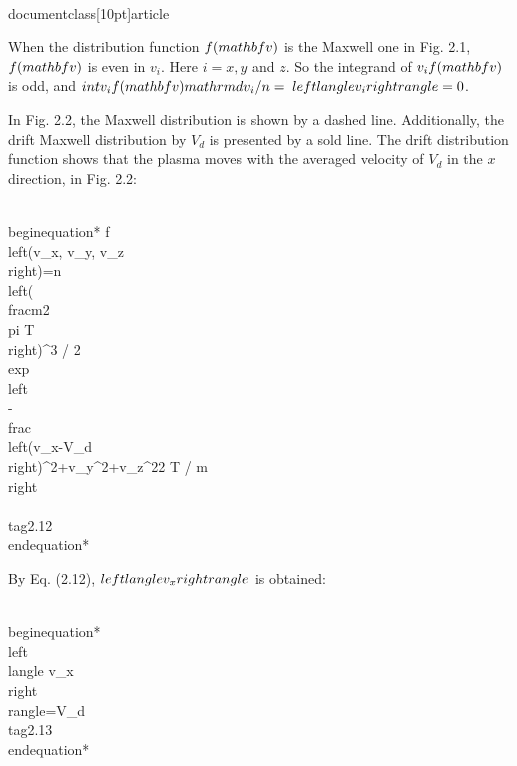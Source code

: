 \\documentclass[10pt]{article}
\begin{document}
When the distribution function $f(\\mathbf{v})$ is the Maxwell one in Fig. 2.1, $f(\\mathbf{v})$ is even in $v_{i}$. Here $i=x, y$ and $z$. So the integrand of $v_{i} f(\\mathbf{v})$ is odd, and $\\int v_{i} f(\\mathbf{v}) \\mathrm{d} v_{i} / n=$ $\\left\\langle v_{i}\\right\\rangle=0$.

In Fig. 2.2, the Maxwell distribution is shown by a dashed line. Additionally, the drift Maxwell distribution by $V_{d}$ is presented by a sold line. The drift distribution function shows that the plasma moves with the averaged velocity of $V_{d}$ in the $x$ direction, in Fig. 2.2:


\\begin{equation*}
f\\left(v_{x}, v_{y}, v_{z}\\right)=n\\left(\\frac{m}{2 \\pi T}\\right)^{3 / 2} \\exp \\left\\{-\\frac{\\left(v_{x}-V_{d}\\right)^{2}+v_{y}^{2}+v_{z}^{2}}{2 T / m}\\right\\} \\tag{2.12}
\\end{equation*}


By Eq. (2.12), $\\left\\langle v_{x}\\right\\rangle$ is obtained:


\\begin{equation*}
\\left\\langle v_{x}\\right\\rangle=V_{d} \\tag{2.13}
\\end{equation*}
\end{document}
